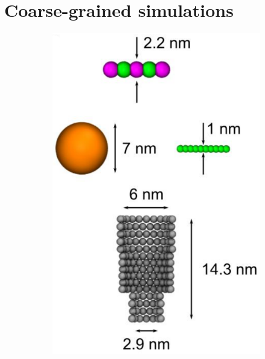 \section{Coarse-grained simulations}

\begin{figure}[ht]
  \begin{centering}
  \begin{subfigure}[t]{\dimexpr.5\linewidth-1.3em\relax}
  \centering
  \includegraphics[width=.9\linewidth,valign=t]{Figures/Stefanos1.png}
  \end{subfigure}%
  \begin{subfigure}[t]{\dimexpr.5\linewidth-1.3em\relax}
  \centering

\end{subfigure}
\end{centering}
\end{figure}
